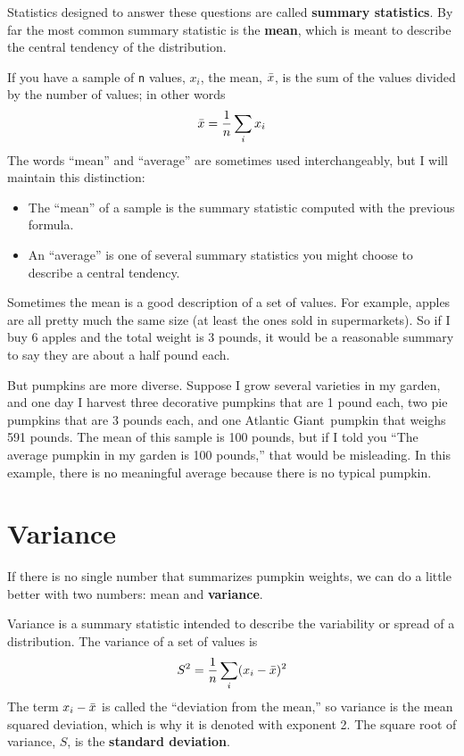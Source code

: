 \documentclass[12pt]{book}
\begin{document}
Statistics designed to answer these questions are called {\bf summary
  statistics}.  By far the most common summary statistic is the {\bf
  mean}, which is meant to describe the central tendency of the
distribution.    

If you have a sample of {\tt n} values, $x_i$, the mean, $\bar{x}$, is
the sum of the values divided by the number of values; in other words
%
\[ \bar{x} = \frac{1}{n} \sum_i x_i \]
%
The words ``mean'' and ``average'' are sometimes used interchangeably,
but I will maintain this distinction:

\begin{itemize}

\item The ``mean'' of a sample is the summary statistic computed with
  the previous formula.

\item An ``average'' is one of several summary statistics you might
  choose to describe a central tendency.

\end{itemize}

Sometimes the mean is a good description of a set of values.  For
example, apples are all pretty much the same size (at least the ones
sold in supermarkets).  So if I buy 6 apples and the total weight is 3
pounds, it would be a reasonable summary to say they are about a half
pound each.

But pumpkins are more diverse.  Suppose I grow several varieties in my
garden, and one day I harvest three decorative pumpkins that are 1
pound each, two pie pumpkins that are 3 pounds each, and one Atlantic
Giant\textregistered~pumpkin that weighs 591 pounds.  The mean of this
sample is 100 pounds, but if I told you ``The average pumpkin in my
garden is 100 pounds,'' that would be misleading.  In this example,
there is no meaningful average because there is no typical pumpkin.



\section{Variance}

If there is no single number that summarizes pumpkin weights,
we can do a little better with two numbers: mean and {\bf variance}.

Variance is a summary statistic intended to describe the variability
or spread of a distribution.  The variance of a set of values is
%
\[ S^2 = \frac{1}{n} \sum_i (x_i - \bar{x})^2 \]
%
The term $x_i - \bar{x}$ is called the ``deviation from the mean,'' so
variance is the mean squared deviation, which is why it is denoted
with exponent 2.  The square root of variance, $S$, is the
{\bf standard deviation}.   
\end{document}

